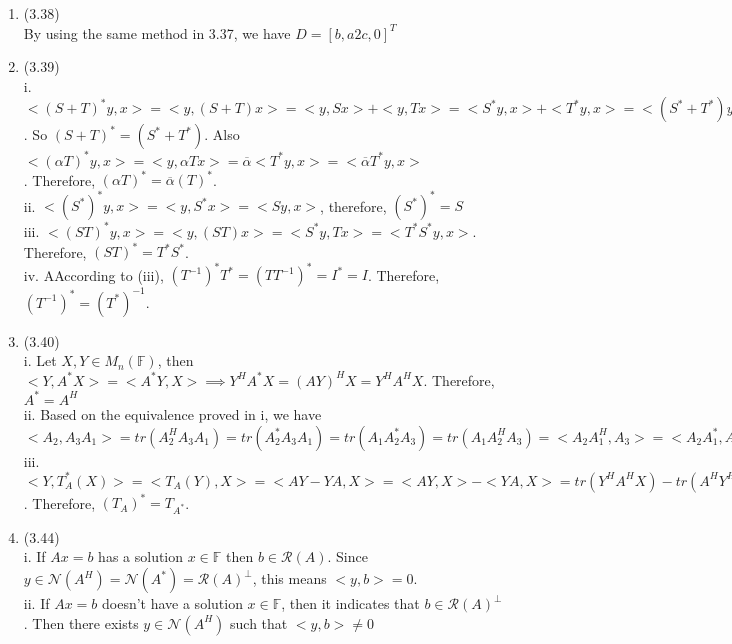 \documentclass[letterpaper,12pt]{article}
\theoremstyle{definition}
\begin{document}
\begin{enumerate}
	\item(3.38)\\
	By using the same method in 3.37, we have $D = [b, a2c, 0]^{T}$\\

	\item(3.39)\\
	i. $<(S+T)^{*}y, x> = <y, (S + T)x> = <y, Sx> + <y, Tx> = <S^{*}y, x> + <T^{*}y, x> = <(S^{*} + T^{*})y, x>$. So $(S + T)^{*} = (S^{*} + T^{*})$. Also $<(\alpha T)^{*}y, x> = <y,\alpha Tx> = \overline{\alpha}<T^{*}y,x> = <\overline{\alpha}T^{*}y,x>$\\. Therefore, $(\alpha T)^{*} = \overline{\alpha}(T)^{*}$.\\
	ii. $<(S^{*})^{*}y, x> = <y,S^{*}x> = <Sy, x>$, therefore, $(S^{*})^{*} = S$\\
	iii. $<(ST)^{*}y,x> = <y, (ST)x> = <S^{*}y,Tx> = <T^{*}S^{*}y,x>$. Therefore, $(ST)^{*} = T^{*}S^{*}$.\\
	iv. AAccording to (iii), $(T^{-1})^{*}T^{*} = (TT^{-1})^{*} = I^{*} = I$. Therefore, $(T^{-1})^{*} = (T^{*})^{-1}$.\\


	\item(3.40)\\
	i. Let $X, Y \in M_{n}(\mathbb{F})$, then $<Y, A^*X> = <A^*Y, X> \implies Y^{H}A^{*}X = (AY)^{H}X = Y^{H}A^{H}X$. Therefore, $A^{*} = A^{H}$\\
	ii. Based on the equivalence proved in i, we have $<A_{2}, A_{3}A_{1}> = tr(A_{2}^{H}A_{3}A_{1}) =  tr(A_{2}^{*}A_{3}A_{1}) =  tr(A_{1}A_{2}^{*}A_{3}) = tr(A_{1}A_{2}^{H}A_{3}) = <A_{2}A_{1}^{H}, A_{3}> = <A_{2}A_{1}^{*}, A_{3}> $\\
	iii. $<Y, T_{A}^{*}(X)> = <T_{A}(Y), X> = <AY - YA, X> = <AY, X> - <YA, X>  = tr(Y^{H}A^{H}X) - tr(A^{H}Y^{H}X) =  tr(Y^{H}(A^{H}X)) - tr(Y^{H}(XA^{H})) = <Y, A^{H}X> - <Y, XA^{H}> =<Y, A^{*}X> - <Y, XA^{*}> = <Y, T_{A^{*}}(X)>$. Therefore, $(T_{A})^{*} = T_{A^{*}}$.\\

	\item(3.44)\\
	i. If $Ax = b$ has a solution $x \in \mathbb{F}$ then $b \in \mathcal{R}(A)$. Since $y \in \mathcal{N}(A^{H}) =\mathcal{N}(A^{*}) = \mathcal{R}(A)^{\bot} $, this means $<y, b> = 0$.\\
	ii.  If $Ax = b$ doesn't have a solution $x \in \mathbb{F}$, then it indicates that  $b \in \mathcal{R}(A)^{\bot}$. Then there exists $y \in \mathcal{N}(A^{H})$ such that $<y,b> \neq 0$\\


\end{enumerate}
\end{document}
